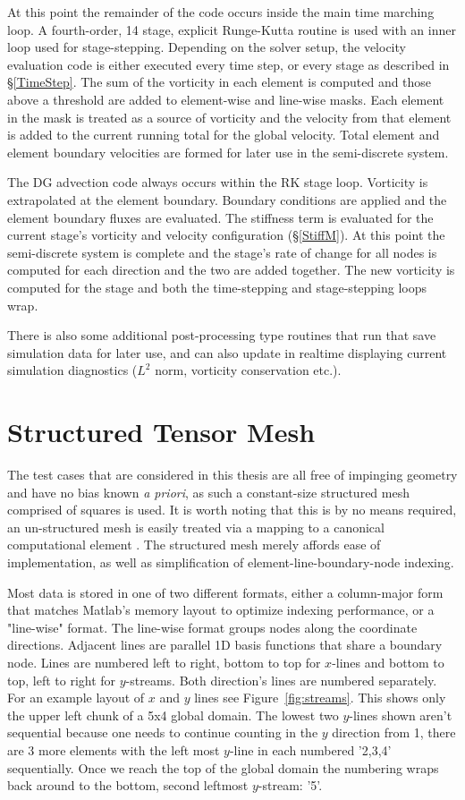 \documentclass[letterpaper,12pt]{report}
\begin{document}
At this point the remainder of the code occurs inside the main time marching loop. A fourth-order, 14 stage, explicit Runge-Kutta routine is used with an inner loop used for stage-stepping. Depending on the solver setup, the velocity evaluation code is either executed every time step, or every stage as described in \S\ref{TimeStep}. The sum of the vorticity in each element is computed and those above a threshold are added to element-wise and line-wise masks. Each element in the mask is treated as a source of vorticity and the velocity from that element is added to the current running total for the global velocity. Total element and element boundary velocities are formed for later use in the semi-discrete system.

The DG advection code always occurs within the RK stage loop. Vorticity is extrapolated at the element boundary. Boundary conditions are applied and the element boundary fluxes are evaluated. The stiffness term is evaluated for the current stage's vorticity and velocity configuration (\S\ref{StiffM}). At this point the semi-discrete system is complete and the stage's rate of change for all nodes is computed for each direction and the two are added together. The new vorticity is computed for the stage and both the time-stepping and stage-stepping loops wrap.

There is also some additional post-processing type routines that run that save simulation data for later use, and can also update in realtime displaying current simulation diagnostics ($L^2$ norm, vorticity conservation etc.).

%
\section{Structured Tensor Mesh}\label{NodeNum}
The test cases that are considered in this thesis are all free of impinging geometry and have no bias known \textit{a priori}, as such a constant-size structured mesh comprised of squares is used. It is worth noting that this is by no means required, an un-structured mesh is easily treated via a mapping to a canonical computational element \cite{Persson2013}. The structured mesh merely affords ease of implementation, as well as simplification of element-line-boundary-node indexing.

Most data is stored in one of two different formats, either a column-major form that matches Matlab's memory layout to optimize indexing performance, or a "line-wise" format. The line-wise format groups nodes along the coordinate directions. Adjacent lines are parallel 1D basis functions that share a boundary node. Lines are numbered left to right, bottom to top for $x$-lines and bottom to top, left to right for $y$-streams. Both direction's lines are numbered separately. For an example layout of $x$ and $y$ lines see Figure~\ref{fig:streams}. This shows only the upper left chunk of a 5x4 global domain. The lowest two $y$-lines shown aren't sequential because one needs to continue counting in the $y$ direction from 1, there are 3 more elements with the left most $y$-line in each numbered '2,3,4' sequentially. Once we reach the top of the global domain the numbering wraps back around to the bottom, second leftmost $y$-stream: '5'.
\end{document}

